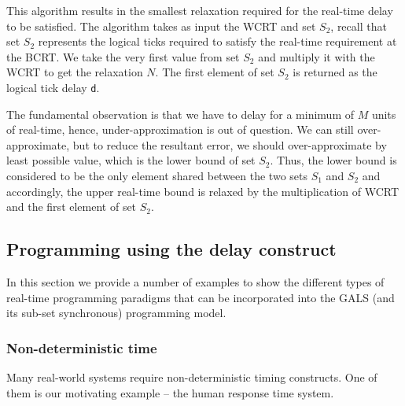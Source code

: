 This algorithm results in the smallest relaxation required for the
real-time delay to be satisfied. The algorithm takes as input the WCRT
and set $S_2$, recall that set $S_2$ represents the logical ticks
required to satisfy the real-time requirement at the BCRT. We take the
very first value from set $S_2$ and multiply it with the WCRT to get the
relaxation $N$. The first element of set $S_2$ is returned as the
logical tick delay \texttt{d}.

The fundamental observation is that we have to delay for a minimum of
$M$ units of real-time, hence, under-approximation is out of
question. We can still over-approximate, but to reduce the resultant
error, we should over-approximate by least possible value, which is the
lower bound of set $S_2$. Thus, the lower bound is considered to be the
only element shared between the two sets $S_1$ and $S_2$ and
accordingly, the upper real-time bound is relaxed by the multiplication
of WCRT and the first element of set $S_2$.


\subsection{Programming using the delay construct}
\label{sec:progr-using-delay}

In this section we provide a number of examples to show the different
types of real-time programming paradigms that can be incorporated into
the GALS (and its sub-set synchronous) programming model.

\subsubsection{Non-deterministic time}
\label{sec:non-determ-time}

Many real-world systems require non-deterministic timing constructs. One
of them is our motivating example -- the human response time
system. 


  

